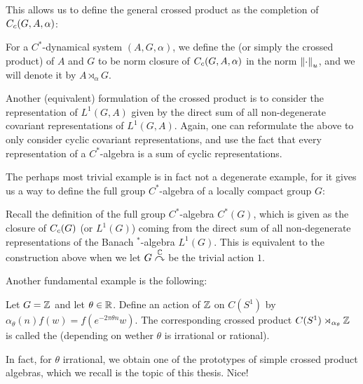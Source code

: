 This allows us to define the general crossed product as the completion of $C_c(G,A,\alpha)$:
\begin{definition}
	For a $C^*$-dynamical system $(A,G,\alpha)$, we define the  (or simply the crossed product) of $A$ and $G$ to be norm closure of $C_c(G,A,\alpha)$ in the norm $\left\lVert \cdot \right\rVert_u$, and we will denote it by $A \rtimes_\alpha G$.
\end{definition}
\begin{remark}
	Another (equivalent) formulation of the crossed product is to consider the representation of $L^1(G,A)$ given by the direct sum of all non-degenerate covariant representations of $L^1(G,A)$. Again, one can reformulate the above to only consider cyclic covariant representations, and use the fact that every representation of a $C^*$-algebra is a sum of cyclic representations.
\end{remark}
The perhaps most trivial example is in fact not a degenerate example, for it gives us a way to define the full group $C^*$-algebra of a locally compact group $G$:
\begin{example}
	Recall the definition of the full group $C^*$-algebra $C^*(G)$, which is given as the closure of $C_c(G)$ (or $L^1(G)$) coming from the direct sum of all non-degenerate representations of the Banach $^*$-algebra $L^1(G)$. This is equivalent to the construction above when we let $G \stackrel{\mathbb{C}}{\curvearrowright}$ be the trivial action $1$. 
\end{example}
Another fundamental example is the following:
\begin{example}
	Let $G = \mathbb{Z}$ and let $\theta \in \mathbb{R}$. Define an action of $\mathbb{Z}$ on $C(S^1)$ by $\alpha_\theta(n)f(w) = f(e^{-2\pi \theta n} w)$. The corresponding crossed product $C(S^1) \rtimes_{\alpha_\theta} \mathbb{Z}$ is called the  (depending on wether $\theta$ is irrational or rational).
\end{example}
In fact, for $\theta$ irrational, we obtain one of the prototypes of simple crossed product algebras, which we recall is the topic of this thesis. Nice!

